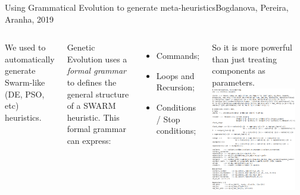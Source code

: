 \documentclass[aspectratio=169]{beamer}
\begin{document}
\begin{frame}{Using Grammatical Evolution to generate meta-heuristics}{Bogdanova, Pereira, Aranha, 2019}
  \begin{columns}

    We used  to automatically
    generate Swarm-like (DE, PSO, etc) heuristics.\bigskip

    Genetic Evolution uses a \emph{formal grammar} to defines the general
    structure of a SWARM heuristic. This formal grammar can express:
    \begin{itemize}
      \item Commands;
      \item Loops and Recursion;
      \item Conditions / Stop conditions;
    \end{itemize}\medskip

    So it is more powerful than just treating components as
    parameters.
    \includegraphics[width=0.9\textwidth]{img/GE_setup.png}
  \end{columns}
\end{frame}
\end{document}
